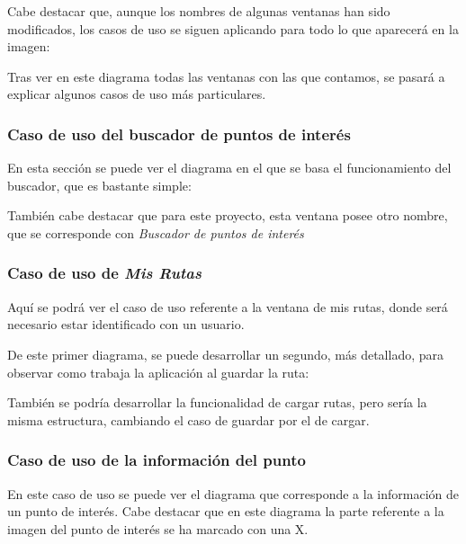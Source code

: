 Cabe destacar que, aunque los nombres de algunas ventanas han sido modificados, los casos de uso se siguen aplicando para todo lo que aparecerá en la imagen:


Tras ver en este diagrama todas las ventanas con las que contamos, se pasará a explicar algunos casos de uso más particulares.

\subsubsection{Caso de uso del buscador de puntos de interés}

En esta sección se puede ver el diagrama en el que se basa el funcionamiento del buscador, que es bastante simple:


También cabe destacar que para este proyecto, esta ventana posee otro nombre, que se corresponde con \textit{Buscador de puntos de interés}

\subsubsection{Caso de uso de \textit{Mis Rutas}}

Aquí se podrá ver el caso de uso referente a la ventana de mis rutas, donde será necesario estar identificado con un usuario.


De este primer diagrama, se puede desarrollar un segundo, más detallado, para observar como trabaja la aplicación al guardar la ruta:


También se podría desarrollar la funcionalidad de cargar rutas, pero sería la misma estructura, cambiando el caso de guardar por el de cargar.

\subsubsection{Caso de uso de la información del punto}

En este caso de uso se puede ver el diagrama que corresponde a la información de un punto de interés. Cabe destacar que en este diagrama la parte referente a la imagen del punto de interés se ha marcado con una X.

